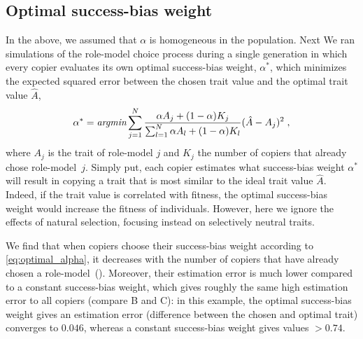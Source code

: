 \documentclass[12pt]{extarticle}
\begin{document}
\subsection*{Optimal success-bias weight}
In the above, we assumed that $\alpha$ is homogeneous in the population. 
Next
We ran simulations of the role-model choice process during a single generation in which every copier evaluates its own optimal success-bias weight, $\alpha^*$, which minimizes the expected squared error between the chosen trait value and the optimal trait value $\hat{A}$,
\begin{equation}\label{eq:optimal_alpha}
\alpha^* = \emph{argmin} \sum_{j=1}^N\frac{\alpha A_j + (1-\alpha) K_j}{\sum_{l=1}^N\alpha A_l + (1-\alpha) K_l} (\hat{A}-A_j)^2 \;,
\end{equation}
where $A_j$ is the trait of role-model $j$ and $K_j$ the number of copiers that already chose role-model~$j$.
Simply put, each copier estimates what success-bias weight $\alpha^*$ will result in copying a trait that is most similar to the ideal trait value $\hat{A}$.
Indeed, if the trait value is correlated with fitness, the optimal success-bias weight would increase the fitness of individuals. However, here we ignore the effects of natural selection, focusing instead on selectively neutral traits.

We find that when copiers choose their success-bias weight according to \cref{eq:optimal_alpha}, it decreases with the number of copiers that have already chosen a role-model~().
Moreover, their estimation error is much lower compared to a constant success-bias weight, which gives roughly the same high estimation error to all copiers (compare B and C): in this example, the optimal success-bias weight gives an estimation error (difference between the chosen and optimal trait) converges to $0.046$, whereas a constant success-bias weight gives values $>0.74$.
\end{document}
